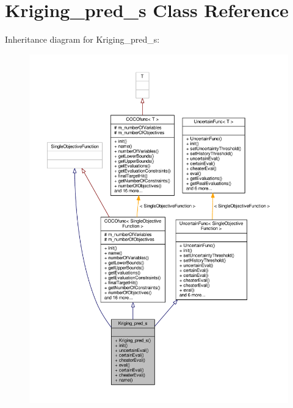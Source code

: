 \hypertarget{classKriging__pred__s}{}\section{Kriging\+\_\+pred\+\_\+s Class Reference}
\label{classKriging__pred__s}


Inheritance diagram for Kriging\+\_\+pred\+\_\+s\+:
\nopagebreak
\begin{figure}[H]
\begin{center}
\leavevmode
\includegraphics[width=350pt]{classKriging__pred__s__inherit__graph}
\end{center}
\end{figure}


